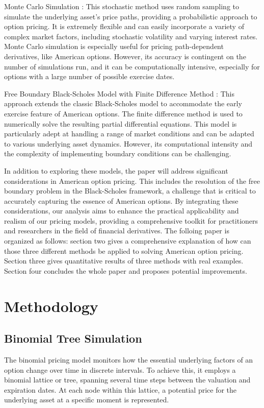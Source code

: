 \documentclass{article}
\begin{document}
Monte Carlo Simulation \cite{Boyle1977May}: This stochastic method uses random sampling to simulate the underlying asset's price paths, providing a probabilistic approach to option pricing. It is extremely flexible and can easily incorporate a variety of complex market factors, including stochastic volatility and varying interest rates. Monte Carlo simulation is especially useful for pricing path-dependent derivatives, like American options. However, its accuracy is contingent on the number of simulations run, and it can be computationally intensive, especially for options with a large number of possible exercise dates.

Free Boundary Black-Scholes Model with Finite Difference Method \cite{Cen2011May}: This approach extends the classic Black-Scholes model to accommodate the early exercise feature of American options. The finite difference method is used to numerically solve the resulting partial differential equations. This model is particularly adept at handling a range of market conditions and can be adapted to various underlying asset dynamics. However, its computational intensity and the complexity of implementing boundary conditions can be challenging.

In addition to exploring these models, the paper will address significant considerations in American option pricing. This includes the resolution of the free boundary problem in the Black-Scholes framework, a challenge that is critical to accurately capturing the essence of American options. By integrating these considerations, our analysis aims to enhance the practical applicability and realism of our pricing models, providing a comprehensive toolkit for practitioners and researchers in the field of financial derivatives. The folloing paper is organized as follows: section two gives a comprehensive explanation of how can those three different methods be applied to solving American option pricing. Section three gives quantitative results of three methods with real examples. Section four concludes the whole paper and proposes potential improvements. 


\section{Methodology}

\subsection{Binomial Tree Simulation}
The binomial pricing model monitors how the essential underlying factors of an option change over time in discrete intervals. To achieve this, it employs a binomial lattice or tree, spanning several time steps between the valuation and expiration dates. At each node within this lattice, a potential price for the underlying asset at a specific moment is represented.
\end{document}
